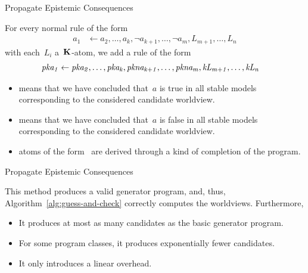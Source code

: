\documentclass[aspectratio=169,svgnames,xcolor=table,t]{beamer}
\begin{document}
\begin{frame}{Propagate Epistemic Consequences}
    \begin{myitemize}
        \item[] For every normal rule of the form
        \begin{align}
            a_1 &\leftarrow 
            a_2,\!\dotsc\!,a_k,
            \neg a_{k+1},\!\dotsc\!,\neg a_m,
            {L_{m+1}},\!\dotsc\!,{L_n}
        \end{align}
        with each~$L_i$ a~$\mathbf{K}$-atom, we add a rule of the form
        \begin{gather}
            \begin{aligned}
                \kp{a_1} &\span\span\leftarrow 
                \kp{a_2},\dotsc,\kp{a_k},
                \kpnott{a_{k+1}},\dotsc,\kpnott{a_m},
                \kk{L_{m+1}},\dotsc,\kk{L_n}
            \end{aligned}
        \end{gather}
        \vspace*{-15pt}
        \begin{itemize}
            \item {} means that we have concluded that~$a$ is true in all stable models corresponding to the considered candidate worldview.
            \item {} means that we have concluded that~$a$ is false in all stable models corresponding to the considered candidate worldview.
            \item atoms of the form~ are derived through a kind of completion of the program.
        \end{itemize}
    \end{myitemize}
\end{frame}
\begin{frame}[c]{Propagate Epistemic Consequences}
    \begin{theorem}
        This method produces a valid generator program, and, thus, Algorithm~\ref{alg:guess-and-check} correctly computes the worldviews.
        Furthermore,
        \begin{itemize}
            \item It produces at most as many candidates as the basic generator program.
            \item For some program classes, it produces exponentially fewer candidates.
            \item It only introduces a linear overhead.
        \end{itemize}
    \end{theorem}
\end{frame}
\end{document}
